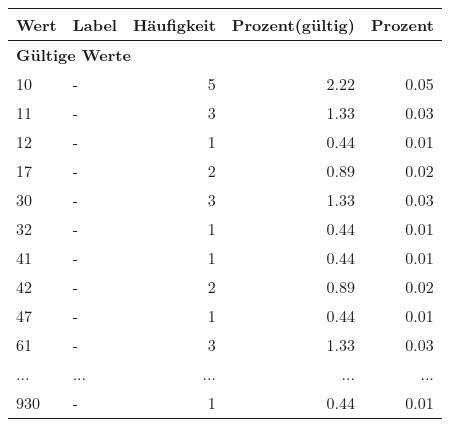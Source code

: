      \begin{longtable}{lXrrr}
     \toprule
     \textbf{Wert} & \textbf{Label} & \textbf{Häufigkeit} & \textbf{Prozent(gültig)} & \textbf{Prozent} \\
     \endhead
     \midrule
     \multicolumn{5}{l}{\textbf{Gültige Werte}}\\
        10 & \multicolumn{1}{X}{-} & %
          \num{5} &
          \num[round-mode=places,round-precision=2]{2.22} &
          \num[round-mode=places,round-precision=2]{0.05} \\
        11 & \multicolumn{1}{X}{-} & %
          \num{3} &
          \num[round-mode=places,round-precision=2]{1.33} &
          \num[round-mode=places,round-precision=2]{0.03} \\
        12 & \multicolumn{1}{X}{-} & %
          \num{1} &
          \num[round-mode=places,round-precision=2]{0.44} &
          \num[round-mode=places,round-precision=2]{0.01} \\
        17 & \multicolumn{1}{X}{-} & %
          \num{2} &
          \num[round-mode=places,round-precision=2]{0.89} &
          \num[round-mode=places,round-precision=2]{0.02} \\
        30 & \multicolumn{1}{X}{-} & %
          \num{3} &
          \num[round-mode=places,round-precision=2]{1.33} &
          \num[round-mode=places,round-precision=2]{0.03} \\
        32 & \multicolumn{1}{X}{-} & %
          \num{1} &
          \num[round-mode=places,round-precision=2]{0.44} &
          \num[round-mode=places,round-precision=2]{0.01} \\
        41 & \multicolumn{1}{X}{-} & %
          \num{1} &
          \num[round-mode=places,round-precision=2]{0.44} &
          \num[round-mode=places,round-precision=2]{0.01} \\
        42 & \multicolumn{1}{X}{-} & %
          \num{2} &
          \num[round-mode=places,round-precision=2]{0.89} &
          \num[round-mode=places,round-precision=2]{0.02} \\
        47 & \multicolumn{1}{X}{-} & %
          \num{1} &
          \num[round-mode=places,round-precision=2]{0.44} &
          \num[round-mode=places,round-precision=2]{0.01} \\
        61 & \multicolumn{1}{X}{-} & %
          \num{3} &
          \num[round-mode=places,round-precision=2]{1.33} &
          \num[round-mode=places,round-precision=2]{0.03} \\
       ... & ... & ... & ... & ... \\
        930 & \multicolumn{1}{X}{-} & %
          \num{1} &
          \num[round-mode=places,round-precision=2]{0.44} &
          \num[round-mode=places,round-precision=2]{0.01} \\


\end{longtable}
